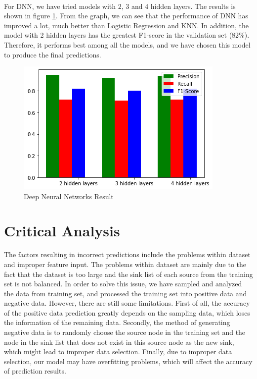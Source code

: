 \documentclass[fleqn,11pt]{olplainarticle}
\begin{document}
\paragraph*{}
For DNN, we have tried models with 2, 3 and 4 hidden layers. The results is shown in figure \ref{fig:res}. From the graph, we can see that the performance of DNN has improved a lot, much better than Logistic Regression and KNN. In addition, the model with 2 hidden layers has the greatest F1-score in the validation set (82\%). Therefore, it performs best among all the models, and we have chosen this model to produce the final predictions.
\begin{figure}[H]
	\centering
	\includegraphics[scale=0.3]{result.png}
	\caption{Deep Neural Networks Result}
	\label{fig:res}
\end{figure}


\section{Critical Analysis}\label{analysis}
\paragraph*{}
The factors resulting in incorrect predictions include the problems within dataset and improper feature input. The problems within dataset are mainly due to the fact that the dataset is too large and the sink list of each source from the training set is not balanced. In order to solve this issue, we have sampled and analyzed the data from training set, and processed the training set into positive data and negative data. However, there are still some limitations. First of all, the accuracy of the positive data prediction greatly depends on the sampling data, which loses the information of the remaining data. Secondly, the method of generating negative data is to randomly choose the source node in the training set and the node in the sink list that does not exist in this source node as the new sink, which might lead to improper data selection. Finally, due to improper data selection, our model may have overfitting problems, which will affect the accuracy of prediction results.
\end{document}

